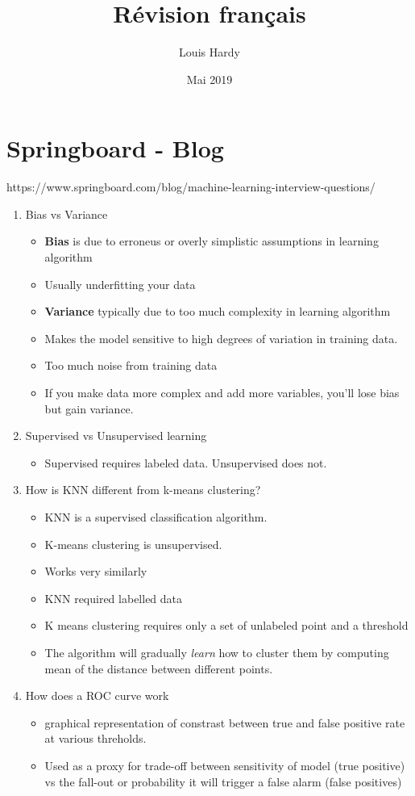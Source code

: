 \documentclass[12pt,a4paper]{article}
\title{Révision français}
\author{Louis Hardy}
\date{Mai 2019}
\begin{document}
\section*{Springboard - Blog}
https://www.springboard.com/blog/machine-learning-interview-questions/ \\
\begin{enumerate}
   \item Bias vs Variance
   \begin{itemize}
     \item \textbf{Bias} is due to erroneus or overly simplistic assumptions in learning algorithm
     \item Usually underfitting your data
     \item \textbf{Variance} typically due to too much complexity in learning algorithm
     \item Makes the model sensitive to high degrees of variation in training data. 
     \item Too much noise from training data
     \item If you make data more complex and add more variables, you'll lose bias but gain variance. 
   \end{itemize}
   \item Supervised vs Unsupervised learning
   \begin{itemize}
       \item Supervised requires labeled data. Unsupervised does not. 
    \end{itemize}
    \item How is KNN different from k-means clustering?
    \begin{itemize}
        \item KNN is a supervised classification algorithm. 
        \item K-means clustering is unsupervised. 
        \item Works very similarly
        \item KNN required labelled data 
        \item K means clustering requires only a set of unlabeled point and a threshold
        \item The algorithm will gradually \textit{learn} how to cluster them by computing mean of the distance between different points.
    \end{itemize}
    \item How does a ROC curve work
    \begin{itemize}
      \item graphical representation of constrast between true and false positive rate at various threholds. 
      \item Used as a proxy for trade-off between sensitivity of model (true positive) vs the fall-out or probability it will trigger a false alarm (false positives)
      
    \end{itemize}
\end{enumerate}
\noindent\hrulefill
\end{document}
